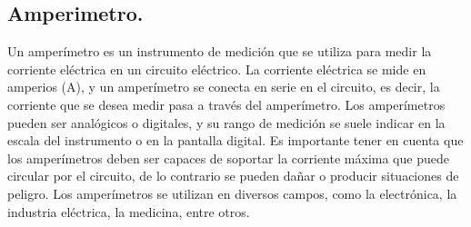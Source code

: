 \documentclass[10pt]{article}
\begin{document}
\begin{multicols}{2}
\subsection{Amperimetro.} 

Un amperímetro es un instrumento de medición que se utiliza para medir la corriente eléctrica en un circuito eléctrico. La corriente eléctrica se mide en amperios (A), y un amperímetro se conecta en serie en el circuito, es decir, la corriente que se desea medir pasa a través del amperímetro. Los amperímetros pueden ser analógicos o digitales, y su rango de medición se suele indicar en la escala del instrumento o en la pantalla digital. Es importante tener en cuenta que los amperímetros deben ser capaces de soportar la corriente máxima que puede circular por el circuito, de lo contrario se pueden dañar o producir situaciones de peligro. Los amperímetros se utilizan en diversos campos, como la electrónica, la industria eléctrica, la medicina, entre otros. 


\end{multicols}
\end{document}
